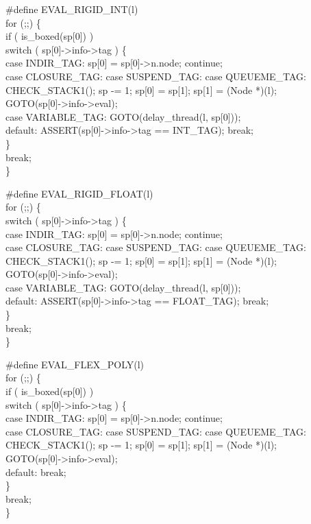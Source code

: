 #define EVAL_RIGID_INT(l) \\
for (;;) \{ \\
    if ( is_boxed(sp[0]) ) \\
        switch ( sp[0]->info->tag ) \{ \\
        case INDIR_TAG: sp[0] = sp[0]->n.node; continue; \\
        case CLOSURE_TAG: case SUSPEND_TAG: case QUEUEME_TAG: \\
            CHECK_STACK1(); sp -= 1; sp[0] = sp[1]; sp[1] = (Node *)(l); \\
            GOTO(sp[0]->info->eval); \\
        case VARIABLE_TAG: GOTO(delay_thread(l, sp[0])); \\
        default: ASSERT(sp[0]->info->tag == INT_TAG); break; \\
        \} \\
    break; \\
\}

#define EVAL_RIGID_FLOAT(l) \\
for (;;) \{ \\
    switch ( sp[0]->info->tag ) \{ \\
    case INDIR_TAG: sp[0] = sp[0]->n.node; continue; \\
    case CLOSURE_TAG: case SUSPEND_TAG: case QUEUEME_TAG: \\
        CHECK_STACK1(); sp -= 1; sp[0] = sp[1]; sp[1] = (Node *)(l); \\
        GOTO(sp[0]->info->eval); \\
    case VARIABLE_TAG: GOTO(delay_thread(l, sp[0])); \\
    default: ASSERT(sp[0]->info->tag == FLOAT_TAG); break; \\
    \} \\
    break; \\
\}

#define EVAL_FLEX_POLY(l) \\
for (;;) \{ \\
    if ( is_boxed(sp[0]) ) \\
        switch ( sp[0]->info->tag ) \{ \\
        case INDIR_TAG: sp[0] = sp[0]->n.node; continue; \\
        case CLOSURE_TAG: case SUSPEND_TAG: case QUEUEME_TAG: \\
            CHECK_STACK1(); sp -= 1; sp[0] = sp[1]; sp[1] = (Node *)(l); \\
            GOTO(sp[0]->info->eval); \\
        default: break; \\
        \} \\
    break; \\
\}

